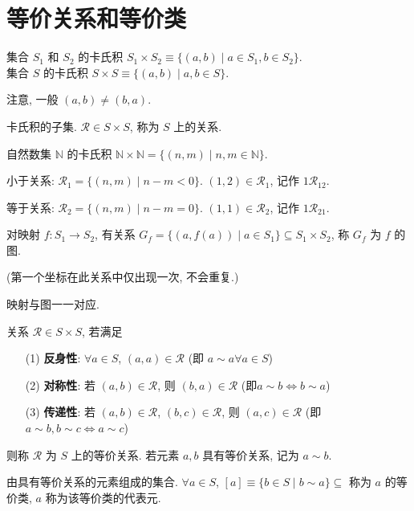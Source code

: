 \documentclass{note}
\begin{document}
\section{等价关系和等价类}
\begin{df}[卡氏积]
    集合 $S_1$ 和 $S_2$ 的卡氏积 $S_1\times S_2\equiv\{(a,b)\mid a\in S_1,b\in S_2\}$.\\
    集合 $S$ 的卡氏积 $S\times S\equiv\{(a,b)\mid a,b\in S\}$.
\end{df}
注意, 一般 $(a,b)\neq (b,a)$.

\begin{df}[关系]
    卡氏积的子集. $\mathcal{R}\in S\times S$, 称为 $S$ 上的关系.
\end{df}

\begin{eg}
    自然数集 $\mathbb{N}$ 的卡氏积 $\mathbb{N}\times\mathbb{N}=\{(n,m)\mid n,m\in\mathbb{N}\}$.

    小于关系: $\mathcal{R}_1=\{(n,m)\mid n-m<0\}$. $(1,2)\in\mathcal{R}_1$, 记作 $1\mathcal{R}_12$.

    等于关系: $\mathcal{R}_2=\{(n,m)\mid n-m=0\}$. $(1,1)\in \mathcal{R}_2$, 记作 $1\mathcal{R}_21$.
\end{eg}

\begin{df}[图]
    对映射 $f:S_1\rightarrow S_2$, 有关系 $G_f=\{(a,f(a))\mid a\in S_1\}\subseteq S_1\times S_2$, 称 $G_f$ 为 $f$ 的图.
\end{df}
(第一个坐标在此关系中仅出现一次, 不会重复.)

映射与图一一对应.

\begin{df}[等价关系]
    关系 $\mathcal{R}\in S\times S$, 若满足
    \begin{itemize}
        \item[(1)] \textbf{反身性}: $\forall a\in S$, $(a,a)\in\mathcal{R}$ (即 $a\sim a\forall a\in S$)
        \item[(2)] \textbf{对称性}: 若 $(a,b)\in\mathcal{R}$, 则 $(b,a)\in\mathcal{R}$ (即$a\sim b\Longleftrightarrow b\sim a$)
        \item[(3)] \textbf{传递性}: 若 $(a,b)\in\mathcal{R}$, $(b,c)\in\mathcal{R}$, 则 $(a,c)\in\mathcal{R}$ (即$a\sim b,b\sim c\Longleftrightarrow a\sim c$)
    \end{itemize}
    则称 $\mathcal{R}$ 为 $S$ 上的等价关系. 若元素 $a,b$ 具有等价关系, 记为 $a\sim b$.
\end{df}

\begin{df}[等价类]
    由具有等价关系的元素组成的集合. $\forall a\in S$, $[a]\equiv\{b\in S\mid b\sim a\}\subseteq$ 称为 $a$ 的等价类, $a$ 称为该等价类的代表元.
\end{df}
\end{document}
